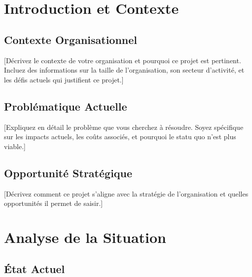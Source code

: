 \tableofcontents
\clearpage

\listoftables
\clearpage

\listoffigures
\clearpage



\clearpage
{}
\setcounter{page}{1}

\section{Introduction et Contexte}

\subsection{Contexte Organisationnel}

[Décrivez le contexte de votre organisation et pourquoi ce projet est pertinent. Incluez des informations sur la taille de l'organisation, son secteur d'activité, et les défis actuels qui justifient ce projet.]

\subsection{Problématique Actuelle}

[Expliquez en détail le problème que vous cherchez à résoudre. Soyez spécifique sur les impacts actuels, les coûts associés, et pourquoi le statu quo n'est plus viable.]


\subsection{Opportunité Stratégique}

[Décrivez comment ce projet s'aligne avec la stratégie de l'organisation et quelles opportunités il permet de saisir.]

\section{Analyse de la Situation}

\subsection{État Actuel}

